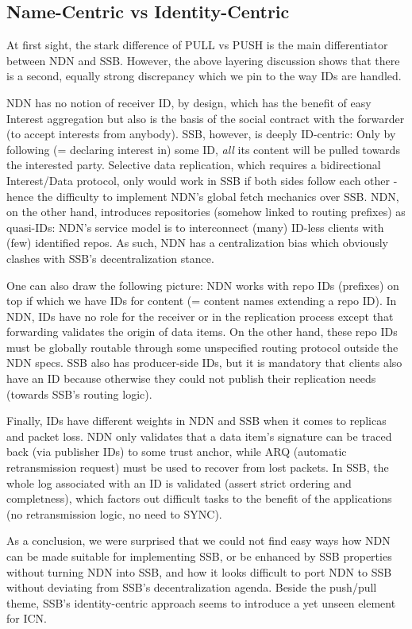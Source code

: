 \documentclass[10pt,sigconf,rewiew]{acmart}
\begin{document}
\subsection{Name-Centric vs Identity-Centric}

At first sight, the stark difference of PULL vs PUSH is the main
differentiator between NDN and SSB. However, the above layering
discussion shows that there is a second, equally strong discrepancy
which we pin to the way IDs are handled.

NDN has no notion of receiver ID, by design, which has the benefit of
easy Interest aggregation but also is the basis of the social contract
with the forwarder (to accept interests from anybody). SSB, however,
is deeply ID-centric: Only by following (= declaring interest in) some
ID, {\em all} its content will be pulled towards the interested
party. Selective data replication, which requires a bidirectional
Interest/Data protocol, only would work in SSB if both sides follow
each other - hence the difficulty to implement NDN's global fetch
mechanics over SSB. NDN, on the other hand, introduces repositories
(somehow linked to routing prefixes) as quasi-IDs: NDN's service model
is to interconnect (many) ID-less clients with (few) identified repos.
As such, NDN has a centralization bias which obviously clashes with
SSB's decentralization stance.

One can also draw the following picture: NDN works with repo IDs
(prefixes) on top if which we have IDs for content (= content names
extending a repo ID). In NDN, IDs have no role for the receiver or in
the replication process except that forwarding validates the origin of
data items. On the other hand, these repo IDs must be globally routable
through some unspecified routing protocol outside the NDN specs. SSB
also has producer-side IDs, but it is mandatory that clients also have
an ID because otherwise they could not publish their replication needs
(towards SSB's routing logic).

Finally, IDs have different weights in NDN and SSB when it comes to
replicas and packet loss. NDN only validates that a data item's
signature can be traced back (via publisher IDs) to some trust anchor,
while ARQ (automatic retransmission request) must be used to recover
from lost packets. In SSB, the whole log associated with an ID is
validated (assert strict ordering and completness), which factors out
difficult tasks to the benefit of the applications (no retransmission
logic, no need to SYNC).

As a conclusion, we were surprised that we could not find easy ways
how NDN can be made suitable for implementing SSB, or be enhanced by
SSB properties without turning NDN into SSB, and how it looks
difficult to port NDN to SSB without deviating from SSB's
decentralization agenda. Beside the push/pull theme, SSB's
identity-centric approach seems to introduce a yet unseen element for
ICN.
\end{document}
